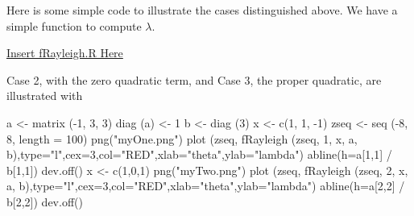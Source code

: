 \documentclass[
  12pt,
]{book}
\newenvironment{Shaded}{\begin{snugshade}}{\end{snugshade}}
\newcommand{\AttributeTok}[1]{\textcolor[rgb]{0.77,0.63,0.00}{#1}}
\newcommand{\DecValTok}[1]{\textcolor[rgb]{0.00,0.00,0.81}{#1}}
\newcommand{\FunctionTok}[1]{\textcolor[rgb]{0.00,0.00,0.00}{#1}}
\newcommand{\NormalTok}[1]{#1}
\newcommand{\OtherTok}[1]{\textcolor[rgb]{0.56,0.35,0.01}{#1}}
\newcommand{\SpecialCharTok}[1]{\textcolor[rgb]{0.00,0.00,0.00}{#1}}
\newcommand{\StringTok}[1]{\textcolor[rgb]{0.31,0.60,0.02}{#1}}
\begin{document}
Here is some simple code to illustrate the cases distinguished above. We have a simple function to compute \(\lambda\).

\href{../code/fRayleigh.R}{Insert fRayleigh.R Here}

Case 2, with the zero quadratic term,
and Case 3, the proper quadratic,
are illustrated with

\begin{Shaded}
\begin{Highlighting}[]
\NormalTok{a }\OtherTok{\textless{}{-}}  \FunctionTok{matrix}\NormalTok{ (}\SpecialCharTok{{-}}\DecValTok{1}\NormalTok{, }\DecValTok{3}\NormalTok{, }\DecValTok{3}\NormalTok{)}
\FunctionTok{diag}\NormalTok{ (a) }\OtherTok{\textless{}{-}} \DecValTok{1}
\NormalTok{b }\OtherTok{\textless{}{-}}  \FunctionTok{diag}\NormalTok{ (}\DecValTok{3}\NormalTok{)}
\NormalTok{x }\OtherTok{\textless{}{-}} \FunctionTok{c}\NormalTok{(}\DecValTok{1}\NormalTok{, }\DecValTok{1}\NormalTok{, }\SpecialCharTok{{-}}\DecValTok{1}\NormalTok{)}
\NormalTok{zseq }\OtherTok{\textless{}{-}} \FunctionTok{seq}\NormalTok{ (}\SpecialCharTok{{-}}\DecValTok{8}\NormalTok{, }\DecValTok{8}\NormalTok{, }\AttributeTok{length =} \DecValTok{100}\NormalTok{)}
\FunctionTok{png}\NormalTok{(}\StringTok{"myOne.png"}\NormalTok{)}
\FunctionTok{plot}\NormalTok{ (zseq, }\FunctionTok{fRayleigh}\NormalTok{ (zseq, }\DecValTok{1}\NormalTok{, x, a, b),}\AttributeTok{type=}\StringTok{"l"}\NormalTok{,}\AttributeTok{cex=}\DecValTok{3}\NormalTok{,}\AttributeTok{col=}\StringTok{"RED"}\NormalTok{,}\AttributeTok{xlab=}\StringTok{"theta"}\NormalTok{,}\AttributeTok{ylab=}\StringTok{"lambda"}\NormalTok{)}
\FunctionTok{abline}\NormalTok{(}\AttributeTok{h=}\NormalTok{a[}\DecValTok{1}\NormalTok{,}\DecValTok{1}\NormalTok{] }\SpecialCharTok{/}\NormalTok{ b[}\DecValTok{1}\NormalTok{,}\DecValTok{1}\NormalTok{])}
\FunctionTok{dev.off}\NormalTok{()}
\NormalTok{x }\OtherTok{\textless{}{-}} \FunctionTok{c}\NormalTok{(}\DecValTok{1}\NormalTok{,}\DecValTok{0}\NormalTok{,}\DecValTok{1}\NormalTok{)}
\FunctionTok{png}\NormalTok{(}\StringTok{"myTwo.png"}\NormalTok{)}
\FunctionTok{plot}\NormalTok{ (zseq, }\FunctionTok{fRayleigh}\NormalTok{ (zseq, }\DecValTok{2}\NormalTok{, x, a, b),}\AttributeTok{type=}\StringTok{"l"}\NormalTok{,}\AttributeTok{cex=}\DecValTok{3}\NormalTok{,}\AttributeTok{col=}\StringTok{"RED"}\NormalTok{,}\AttributeTok{xlab=}\StringTok{"theta"}\NormalTok{,}\AttributeTok{ylab=}\StringTok{"lambda"}\NormalTok{)}
\FunctionTok{abline}\NormalTok{(}\AttributeTok{h=}\NormalTok{a[}\DecValTok{2}\NormalTok{,}\DecValTok{2}\NormalTok{] }\SpecialCharTok{/}\NormalTok{ b[}\DecValTok{2}\NormalTok{,}\DecValTok{2}\NormalTok{])}
\FunctionTok{dev.off}\NormalTok{()}
\end{Highlighting}
\end{Shaded}
\end{document}
